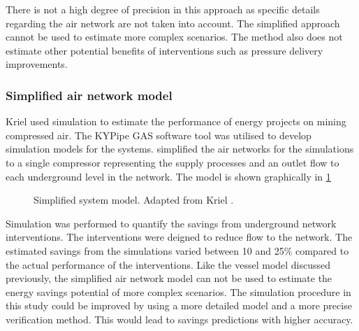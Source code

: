 There is not a high degree of precision in this approach as specific details regarding the air network are not taken into account. The simplified approach cannot be used to estimate more complex scenarios. The method also does not estimate other potential benefits of interventions such as pressure delivery improvements.

\subsubsection{Simplified air network model}
Kriel \cite{Kriel2014Masters} used simulation to estimate the performance of energy projects on mining compressed air. The KYPipe GAS software tool was utilised to develop simulation models for the systems. \cite{Kriel2014Masters} simplified the air networks for the simulations to a single compressor representing the supply processes and an outlet flow to each underground level in the network. The model is shown graphically in \cref{fig:kriel  model}
\begin{figure}[h!]
	\centering
	\caption[Simplified system model.]{Simplified system model. Adapted from Kriel \cite{Kriel2014Masters}.}
	\label{fig:kriel  model}
\end{figure}
\par 
Simulation was performed to quantify the savings from underground network interventions. The interventions were deigned to reduce flow to the network. The estimated savings from the simulations varied between 10 and 25\% compared to the actual performance of the interventions. Like the vessel model discussed previously, the simplified air network model can not be used to estimate the energy savings potential of more complex scenarios. The simulation procedure in this study could be improved by using a more detailed model and a more precise verification method. This would lead to savings predictions with higher accuracy. 

